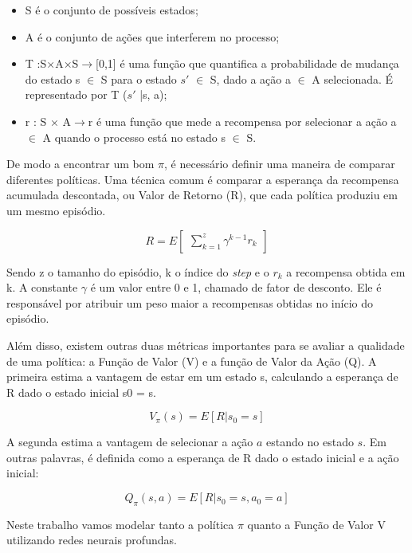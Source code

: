 \begin{itemize}
   \item S é o conjunto de possíveis estados;
   \item A é o conjunto de ações que interferem no processo;
   \item T :S×A×S$\rightarrow$[0,1] é uma função que quantifica a probabilidade de mudança do estado s $\in$ S para o estado $s'$ $\in$ S, dado a ação a $\in$ A selecionada. É representado por T ($s'$ |s, a);
   \item r : S × A$\rightarrow$r é uma função que mede a recompensa por selecionar a ação a $\in$ A quando o processo está no estado s $\in$ S.
 \end{itemize}

De modo a encontrar um bom $\pi$, é necessário definir uma maneira de comparar diferentes políticas. Uma técnica comum é comparar a esperança da recompensa acumulada descontada, ou Valor de Retorno (R), que cada política produziu em um mesmo episódio.

\begin{equation}
    R = E\begin{bmatrix} \sum_{k=1}^{z} \gamma ^{k-1} r_k \end{bmatrix}
\end{equation}

\noindent
Sendo z o tamanho do episódio, k o índice do \textit{step} e o $r_k$ a recompensa obtida em k. A constante $\gamma$ é um valor entre 0 e 1, chamado de fator de desconto. Ele é responsável por atribuir um peso maior a recompensas obtidas no início do episódio. 

Além disso, existem outras duas métricas importantes para se avaliar a qualidade de uma política: a Função de Valor (V) e a função de Valor da Ação (Q). A primeira estima a vantagem de estar em um estado s, calculando a esperança de R dado o estado inicial s0 = s. 

\begin{equation}
    V_\pi(s) = E[R|s_0 = s]
\end{equation}

A segunda estima a vantagem de selecionar a ação $a$ estando no estado $s$. Em outras palavras, é definida como a esperança de R dado o estado inicial e a ação inicial:

\begin{equation}
    Q_\pi(s,a) = E[R|s_0 = s, a_0 = a]
\end{equation}


Neste trabalho vamos modelar tanto a política $\pi$ quanto a Função de Valor V utilizando redes neurais profundas. 

